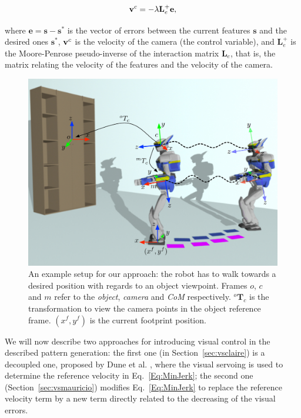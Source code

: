 $$
\text{\bf{v}}^c = -\lambda \mathbf{L}_e^{+} \mathbf{e},
$$

where $\mathbf{e} = \mathbf{s}-\mathbf{s}^{*}$ is the vector of errors between the current features $\mathbf{s}$ and the desired ones $\mathbf{s}^{*}$, $\text{\bf{v}}^c$ is the velocity of the camera (the control variable), and $\mathbf{L}_e^{+}$ is the Moore-Penrose pseudo-inverse of the interaction matrix $\mathbf{L}_e$, that is, the matrix relating the velocity of the features and the velocity of the camera.

\begin{figure}[ht] 
\begin{center}
\includegraphics[scale=0.5]{Chap4-Visual-Servoing/schema_new.pdf} 
\caption{ An example setup for our approach: the robot has to walk towards a desired position with regards to an object viewpoint. Frames $o$, $c$ and $m$ refer to the {\it object}, {\it camera} and {\it CoM} respectively. $^o \mathbf{T}_c$ is the transformation to view the camera points in the object reference frame. $(x^f, y^f)$ is the current footprint position.} 
\label{Fig:Schema}
\end{center}
\end{figure}

We will now describe two approaches for introducing visual control in the described pattern generation: the first one (in Section~\ref{sec:vsclaire}) is a decoupled one, proposed by Dune et al. \citep{DuneIROS2010}, where the visual servoing is used to determine the reference velocity in Eq.~\ref{Eq:MinJerk}; the second one (Section~\ref{sec:vsmauricio}) modifies Eq.~\ref{Eq:MinJerk} to replace the reference velocity term by a new term directly related to the decreasing of the visual errors.


